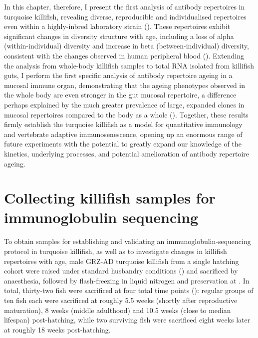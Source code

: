 In this chapter, therefore, I present the first analysis of antibody repertoires in turquoise killifish, revealing diverse, reproducible and individualised repertoires even within a highly-inbred laboratory strain (). These repertoires exhibit significant changes in diversity structure with age, including a loss of alpha (within-individual) diversity and increase in beta (between-individual) diversity, consistent with the changes observed in human peripheral blood (). Extending the analysis from whole-body killifish samples to total RNA isolated from killifish guts, I perform the first specific analysis of antibody repertoire ageing in a mucosal immune organ, demonstrating that the ageing phenotypes observed in the whole body are even stronger in the gut mucosal repertoire, a difference perhaps explained by the much greater prevalence of large, expanded clones in mucosal repertoires compared to the body as a whole (). Together, these results firmly establish the turquoise killifish as a model for quantitative immunology and vertebrate adaptive immunosenescence, opening up an enormous range of future experiments with the potential to greatly expand our knowledge of the kinetics, underlying processes, and potential amelioration of antibody repertoire ageing.



\section{Collecting killifish samples for immunoglobulin sequencing}
\label{sec:igseq_samples}

To obtain samples for establishing and validating an immunoglobulin-sequencing protocol in turquoise killifish, as well as to investigate changes in killifish repertoires with age, male GRZ-AD turquoise killifish from a single hatching cohort were raised under standard husbandry conditions () and sacrificed by anaesthesia, followed by flash-freezing in liquid nitrogen and preservation at . In total, thirty-two fish were sacrificed at four total time points (): regular groups of ten fish each were sacrificed at roughly 5.5 weeks (shortly after reproductive maturation), 8 weeks (middle adulthood) and 10.5 weeks (close to median lifespan) post-hatching, while two surviving fish were sacrificed eight weeks later at roughly 18 weeks post-hatching.

